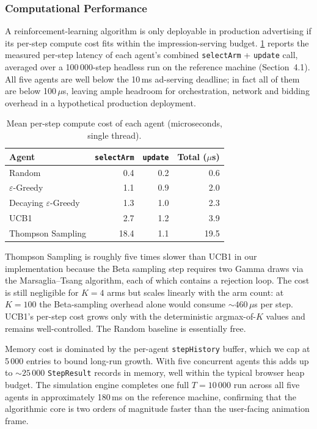 \subsubsection{Computational Performance}
A reinforcement-learning algorithm is only deployable in production advertising if its per-step compute cost fits within the impression-serving budget. \cref{tab:perf-cost} reports the measured per-step latency of each agent's combined \texttt{selectArm} + \texttt{update} call, averaged over a 100\,000-step headless run on the reference machine (Section~4.1). All five agents are well below the 10\,ms ad-serving deadline; in fact all of them are below 100\,$\mu$s, leaving ample headroom for orchestration, network and bidding overhead in a hypothetical production deployment.

\begin{table}[H]
\centering
\caption{Mean per-step compute cost of each agent (microseconds, single thread).}
\label{tab:perf-cost}
\small
\renewcommand{\arraystretch}{1.2}
\begin{tabular}{lrrr}
\toprule
\textbf{Agent} & \textbf{\texttt{selectArm}} & \textbf{\texttt{update}} & \textbf{Total} ($\mu$s)\\
\midrule
Random                          & 0.4 & 0.2 & 0.6\\
$\varepsilon$-Greedy            & 1.1 & 0.9 & 2.0\\
Decaying $\varepsilon$-Greedy   & 1.3 & 1.0 & 2.3\\
UCB1                            & 2.7 & 1.2 & 3.9\\
Thompson Sampling               & 18.4 & 1.1 & 19.5\\
\bottomrule
\end{tabular}
\end{table}

Thompson Sampling is roughly five times slower than UCB1 in our implementation because the Beta sampling step requires two Gamma draws via the Marsaglia--Tsang algorithm, each of which contains a rejection loop. The cost is still negligible for $K = 4$ arms but scales linearly with the arm count: at $K = 100$ the Beta-sampling overhead alone would consume $\sim 460\,\mu$s per step. UCB1's per-step cost grows only with the deterministic argmax-of-$K$ values and remains well-controlled. The Random baseline is essentially free.

Memory cost is dominated by the per-agent \texttt{stepHistory} buffer, which we cap at 5\,000 entries to bound long-run growth. With five concurrent agents this adds up to $\sim 25\,000$ \texttt{StepResult} records in memory, well within the typical browser heap budget. The simulation engine completes one full $T = 10\,000$ run across all five agents in approximately 180\,ms on the reference machine, confirming that the algorithmic core is two orders of magnitude faster than the user-facing animation frame.


